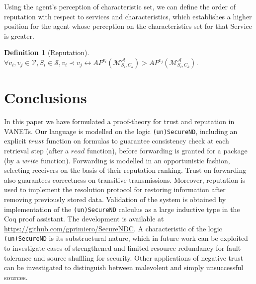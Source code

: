 \documentclass[compsoc, conference, letterpaper, 10pt, times]{IEEEtran}
\newtheorem{definition}{Definition}
\begin{document}
Using the agent's perception of characteristic set, we can define the order of reputation with respect to services and characteristics, which establishes a higher position for the agent whose perception on the characteristics set for that Service is greater.

\begin{definition}[Reputation]
$\forall v_{i}, v_{j}\in \mathcal{V}, S_{i}\in \mathcal{S}, v_{i}\prec v_{j} \leftrightarrow AP^{v_{i}}(\mathcal{M}^{\mathcal{A}}_{S_{i}, C_{k}})>AP^{v_{j}}(\mathcal{M}^{\mathcal{A}}_{S_{i}, C_{k}})$.
\end{definition}

\section{Conclusions}

In this paper we have formulated a proof-theory for trust and reputation in VANETs. Our language is modelled on the logic \texttt{(un)SecureND}, including an explicit $trust$ function on formulas to guarantee consistency check at each retrieval step (after a $read$ function), before forwarding is granted for a package (by a $write$ function). Forwarding is modelled in an opportunistic fashion, selecting receivers on the basis of their reputation ranking. Trust on forwarding also guarantees correctness on transitive transmissions. Moreover, reputation is used to implement the resolution protocol for restoring information after removing previously stored data.
Validation of the system is obtained by implementation of the \texttt{(un)SecureND} calculus as a large inductive type in the Coq proof assistant. The development is available at \url{https://github.com/gprimiero/SecureNDC}. 
A characteristic of the logic \texttt{(un)SecureND} is its substructural nature, which in future work can be exploited to investigate cases of strengthened and limited resource redundancy for fault tolerance and source shuffling for security. Other applications of negative trust can be investigated to distinguish between malevolent and simply unsuccessful sources.




\end{document}
